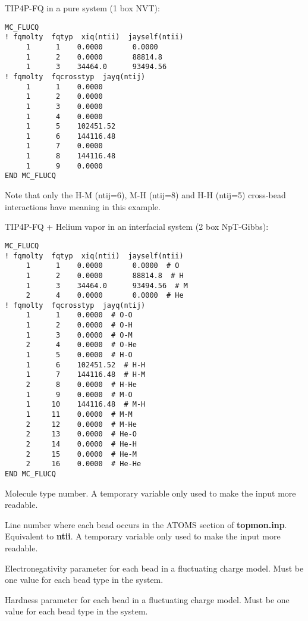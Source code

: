 \documentclass[12pt,letterpaper]{article}
\begin{document}
\hfill\break
TIP4P-FQ in a pure system (1 box NVT):

\begin{verbatim}
MC_FLUCQ
! fqmolty  fqtyp  xiq(ntii)  jayself(ntii)
     1      1    0.0000       0.0000
     1      2    0.0000       88814.8
     1      3    34464.0      93494.56
! fqmolty  fqcrosstyp  jayq(ntij)
     1      1    0.0000
     1      2    0.0000
     1      3    0.0000
     1      4    0.0000
     1      5    102451.52
     1      6    144116.48
     1      7    0.0000
     1      8    144116.48
     1      9    0.0000
END MC_FLUCQ
\end{verbatim}

\noindent Note that only the H-M (ntij=6), M-H (ntij=8) and H-H (ntij=5) cross-bead 
interactions have meaning in this example.

\hfill\break
TIP4P-FQ + Helium vapor in an interfacial system (2 box NpT-Gibbs):

\begin{verbatim}
MC_FLUCQ
! fqmolty  fqtyp  xiq(ntii)  jayself(ntii)
     1      1    0.0000       0.0000  # O
     1      2    0.0000       88814.8  # H 
     1      3    34464.0      93494.56  # M
     2      4    0.0000       0.0000  # He
! fqmolty  fqcrosstyp  jayq(ntij)
     1      1    0.0000  # O-O
     1      2    0.0000  # O-H
     1      3    0.0000  # O-M
     2      4    0.0000  # O-He
     1      5    0.0000  # H-O
     1      6    102451.52  # H-H
     1      7    144116.48  # H-M
     2      8    0.0000  # H-He
     1      9    0.0000  # M-O
     1     10    144116.48  # M-H
     1     11    0.0000  # M-M
     2     12    0.0000  # M-He
     2     13    0.0000  # He-O
     2     14    0.0000  # He-H
     2     15    0.0000  # He-M
     2     16    0.0000  # He-He
END MC_FLUCQ
\end{verbatim}

 Molecule type number. A temporary variable only used to 
make the input more readable.

 Line number where each bead occurs in the ATOMS section 
of {\bf topmon.inp}. Equivalent to {\bf ntii}.
A temporary variable only used to make the input more readable.

 Electronegativity parameter for each bead in a fluctuating charge
model. Must be one value for each bead type in the system.

 Hardness parameter for each bead in a fluctuating charge
model. Must be one value for each bead type in the system.
\end{document}
